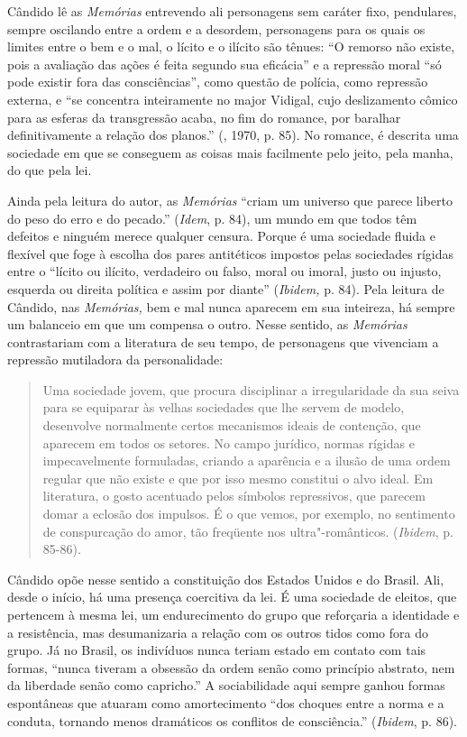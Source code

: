 {Cândido lê as \emph{Memórias} entrevendo ali personagens sem caráter
fixo, pendulares, sempre oscilando entre a ordem e a desordem,
personagens para os quais os limites entre o bem e o mal, o lícito e o
ilícito são tênues: ``O remorso não existe, pois a avaliação das ações é
feita segundo sua eficácia'' e a repressão moral ``só pode existir fora
das consciências'', como questão de polícia, como repressão externa, e
``se concentra inteiramente no major Vidigal, cujo deslizamento cômico
para as esferas da transgressão acaba, no fim do romance, por baralhar
definitivamente a relação dos planos.'' (, 1970, p. 85). No
romance, é descrita uma sociedade em que se conseguem as coisas mais
facilmente pelo jeito, pela manha, do que pela lei.

Ainda pela leitura do autor, as \emph{Memórias} ``criam um universo que
parece liberto do peso do erro e do pecado.'' (\emph{Idem}, p. 84), um
mundo em que todos têm defeitos e ninguém merece qualquer censura.
Porque é uma sociedade fluida e flexível que foge à escolha dos pares
antitéticos impostos pelas sociedades rígidas entre o ``lícito ou
ilícito, verdadeiro ou falso, moral ou imoral, justo ou injusto,
esquerda ou direita política e assim por diante'' (\emph{Ibidem,} p.
84). Pela leitura de Cândido, nas \emph{Memórias,} bem e mal nunca
aparecem em sua inteireza, há sempre um balanceio em que um compensa o
outro. Nesse sentido, as \emph{Memórias} contrastariam com a literatura
de seu tempo, de personagens que vivenciam a repressão mutiladora da
personalidade:

\begin{quote}
Uma sociedade jovem, que procura disciplinar a irregularidade da sua
seiva para se equiparar às velhas sociedades que lhe servem de modelo,
desenvolve normalmente certos mecanismos ideais de contenção, que
aparecem em todos os setores. No campo jurídico, normas rígidas e
impecavelmente formuladas, criando a aparência e a ilusão de uma ordem
regular que não existe e que por isso mesmo constitui o alvo ideal. Em
literatura, o gosto acentuado pelos símbolos repressivos, que parecem
domar a eclosão dos impulsos. É o que vemos, por exemplo, no sentimento
de conspurcação do amor, tão freqüente nos ultra"-românticos.
(\emph{Ibidem}, p. 85-86).
\end{quote}

Cândido opõe nesse sentido a constituição dos Estados Unidos e do
Brasil. Ali, desde o início, há uma presença coercitiva da lei. É uma
sociedade de eleitos, que pertencem à mesma lei, um endurecimento do
grupo que reforçaria a identidade e a resistência, mas desumanizaria a
relação com os outros tidos como fora do grupo. Já no Brasil, os
indivíduos nunca teriam estado em contato com tais formas, ``nunca
tiveram a obsessão da ordem senão como princípio abstrato, nem da
liberdade senão como capricho.'' A sociabilidade aqui sempre ganhou
formas espontâneas que atuaram como amortecimento ``dos choques entre a
norma e a conduta, tornando menos dramáticos os conflitos de
consciência.'' (\emph{Ibidem}, p. 86).

}
